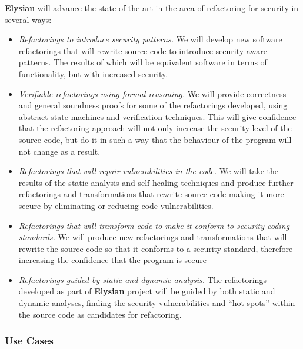 \documentclass[a4paper,11pt]{article}
\newcommand{\project}[1]{\textbf{#1}\xspace}
\newcommand{\SECURITY}{\project{Elysian}}
\newcommand{\TheProject}{\SECURITY}
\begin{document}
\begin{mdframed}[backgroundcolor=gray!10]
\TheProject{} will advance the state of the art in the area of refactoring for security in several ways:
\begin{itemize}
\item \emph{Refactorings to introduce security patterns.} We will develop new software refactorings that will rewrite source code to introduce security aware patterns. The results of which will be equivalent software in terms of functionality, but with increased security.
\item \emph{Verifiable refactorings using formal reasoning.} We will provide correctness and general soundness proofs for some of the refactorings developed, using abstract state machines and verification techniques. This will give confidence that the refactoring approach will not only increase the security level of the source code, but do it in such a way that the behaviour of the program will not change as a result.
\item \emph{Refactorings that will repair vulnerabilities in the code.} We will take the results of the static analysis and self healing techniques and produce further refactorings and transformations that rewrite source-code making it more secure by eliminating or reducing code vulnerabilities. 
\item \emph{Refactorings that will transform code to make it conform to security coding standards.} We will produce new refactorings and transformations that will rewrite the source code so that it conforms to a security standard, therefore increasing the confidence that the program is secure
\item \emph{Refactorings guided by static and dynamic analysis.} The refactorings developed as part of \TheProject{} project will be guided by both static and dynamic analyses, finding the security vulnerabilities and ``hot spots'' within the source code as candidates for refactoring. 
\end{itemize}
\end{mdframed}

\subsubsection{Use Cases}
\label{sect:applications}
\label{sect:background-last}
\end{document}
